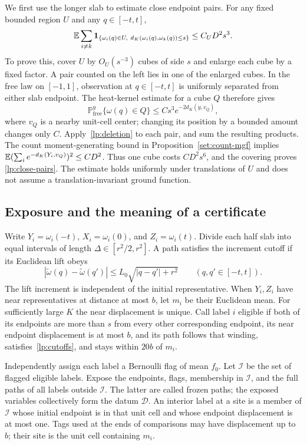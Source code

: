 We first use the longer slab to estimate close endpoint pairs.  For any
fixed bounded region $U$ and any $q\in[-t,t]$,
\begin{equation}\label{lp:close-pairs}
 \mathbb E\sum_{i\ne k}
  \mathbf 1_{\{\omega_i(q)\in U,\ d_K(\omega_i(q),\omega_k(q))\leq s\}}
 \leq C_U D^2s^3.
\end{equation}
To prove this, cover $U$ by $O_U(s^{-3})$ cubes of side $s$ and enlarge
each cube by a fixed factor.  A pair counted on the left lies in one
of the enlarged cubes.  In the free law on $[-1,1]$, observation at
$q\in[-t,t]$ is uniformly separated from either slab endpoint.  The
heat-kernel estimate for a cube $Q$ therefore gives
\[
 \mathbb P_{
 \mathrm{free}}^y\{\omega(q)\in Q\}
 \leq Cs^3e^{-2d_K(y,v_Q)},
\]
where $v_Q$ is a nearby unit-cell center; changing its position by a
bounded amount changes only $C$.  Apply~\eqref{lp:deletion} to each
pair, and sum the resulting products.  The count moment-generating
bound in Proposition~\ref{set:count-mgf} implies
$\mathbb E(\sum_i e^{-d_K(Y_i,v_Q)})^2\leq CD^2$.
Thus one cube costs $CD^2s^6$, and the covering proves
\eqref{lp:close-pairs}.  The estimate holds uniformly under translations
of $U$ and does not assume a translation-invariant ground function.

\subsection{Exposure and the meaning of a certificate}

Write $Y_i=\omega_i(-t)$, $X_i=\omega_i(0)$, and
$Z_i=\omega_i(t)$.  Divide each half slab into equal intervals of
length $\Delta\in[r^2/2,r^2]$.  A path satisfies the increment cutoff if
its Euclidean lift obeys
\begin{equation}\label{lp:cutoffs}
 |\widetilde\omega(q)-\widetilde\omega(q')|
 \leq L_0\sqrt{|q-q'|+r^2}
 \qquad(q,q'\in[-t,t]).
\end{equation}
The lift increment is independent of the initial representative.
When $Y_i,Z_i$ have near representatives at distance at most $b$, let
$m_i$ be their Euclidean mean.  For sufficiently large $K$ the near
displacement is unique.  Call label $i$ eligible if both of its
endpoints are more than $s$ from every other corresponding endpoint,
its near endpoint displacement is at most $b$, and its path follows
that winding, satisfies~\eqref{lp:cutoffs}, and stays within $20b$ of
$m_i$.

Independently assign each label a Bernoulli flag of mean $f_0$.  Let
$\mathcal I$ be the set of flagged eligible labels.  Expose the endpoints,
flags, membership in $\mathcal I$, and the full paths of all labels outside
$\mathcal I$.  The latter are called frozen paths; the exposed variables
collectively form the datum $\mathcal D$.  An interior label at a site is a member
of $\mathcal I$ whose initial endpoint is in that unit cell and whose endpoint
displacement is at most one.  Tags used at the ends of comparisons
may have displacement up to $b$; their site is the unit cell containing
$m_i$.

